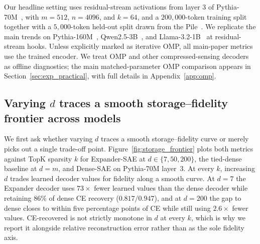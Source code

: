 \documentclass{article}
\theoremstyle{plain}
\theoremstyle{definition}
\theoremstyle{remark}
\begin{document}
Our headline setting uses residual-stream activations from layer 3 of
Pythia-70M~\citep{biderman2023pythia}, with $m{=}512$, $n{=}4096$, and
$k{=}64$, and a $200{,}000$-token training split together with a
$5{,}000$-token held-out split drawn from the
Pile~\citep{gao2020pile}.
%
We replicate the main trends on Pythia-160M~\citep{biderman2023pythia},
Qwen2.5-3B~\citep{qwen2025qwen25}, and
Llama-3.2-1B~\citep{grattafiori2024llama} at residual-stream hooks.
%
Unless explicitly marked as iterative OMP, all main-paper metrics use
the trained encoder.
%
We treat OMP and other compressed-sensing decoders as offline
diagnostics; the main matched-parameter OMP comparison appears in
Section~\ref{sec:exp_practical}, with full details in
Appendix~\ref{app:omp}.


\subsection{Varying $d$ traces a smooth storage--fidelity frontier across models}
\label{sec:exp_frontier}

We first ask whether varying $d$ traces a smooth storage--fidelity curve or merely picks out a single trade-off point.
%
Figure~\ref{fig:storage_frontier} plots both metrics against TopK sparsity $k$ for Expander-SAE at $d \in \{7, 50, 200\}$, the tied-dense baseline at $d{=}m$, and Dense-SAE on Pythia-70M layer~3.
%
At every $k$, increasing $d$ trades learned decoder values for fidelity along a smooth curve.
%
At $d{=}7$ the Expander decoder uses $73\times$ fewer learned values than the dense decoder while retaining $86\%$ of dense CE recovery ($0.817 / 0.947$), and at $d{=}200$ the gap to dense closes to within five percentage points of CE while still using $2.6\times$ fewer values.
%
CE-recovered is not strictly monotone in $d$ at every $k$, which is why we report it alongside relative reconstruction error rather than as the sole fidelity axis.
\end{document}
